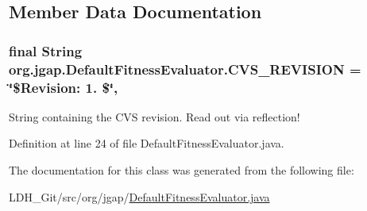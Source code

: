 \subsection{Member Data Documentation}
\hypertarget{classorg_1_1jgap_1_1_default_fitness_evaluator_aecf1f7b9b57f152c923269eba1fc7171}{
\subsubsection[{C\-V\-S\-\_\-\-R\-E\-V\-I\-S\-I\-O\-N}]{\setlength{\rightskip}{0pt plus 5cm}final String org.\-jgap.\-Default\-Fitness\-Evaluator.\-C\-V\-S\-\_\-\-R\-E\-V\-I\-S\-I\-O\-N = \char`\"{}\$Revision\-: 1. \$\char`\"{}\hspace{0.3cm}{\ttfamily [static]}, {\ttfamily [private]}}}\label{classorg_1_1jgap_1_1_default_fitness_evaluator_aecf1f7b9b57f152c923269eba1fc7171}
String containing the C\-V\-S revision. Read out via reflection! 

Definition at line 24 of file Default\-Fitness\-Evaluator.\-java.



The documentation for this class was generated from the following file\-:\begin{DoxyCompactItemize}
\item 
L\-D\-H\-\_\-\-Git/src/org/jgap/\hyperlink{_default_fitness_evaluator_8java}{Default\-Fitness\-Evaluator.\-java}\end{DoxyCompactItemize}
